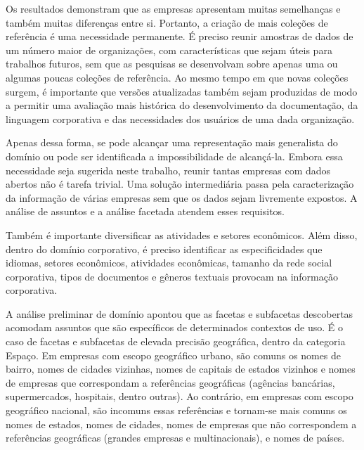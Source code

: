 
Os resultados demonstram que as empresas apresentam muitas semelhanças e também muitas diferenças entre si. Portanto, a criação de mais coleções de referência é uma necessidade permanente. É preciso reunir amostras de dados de um número maior de organizações, com características que sejam úteis para trabalhos futuros, sem que as pesquisas se desenvolvam sobre apenas uma ou algumas poucas coleções de referência. Ao mesmo tempo em que novas coleções surgem, é importante que versões atualizadas também sejam produzidas de modo a permitir uma avaliação mais histórica do desenvolvimento da documentação, da linguagem corporativa e das necessidades dos usuários de uma dada organização. 

Apenas dessa forma, se pode alcançar uma representação mais generalista do domínio ou pode ser identificada a impossibilidade de alcançá-la. Embora essa necessidade seja sugerida neste trabalho, reunir tantas empresas com dados abertos não é tarefa trivial. Uma solução intermediária passa pela caracterização da informação de várias empresas sem que os dados sejam livremente expostos. A análise de assuntos e a análise facetada atendem esses requisitos.


Também é importante diversificar as atividades e setores econômicos. Além disso, dentro do domínio corporativo, é preciso identificar as especificidades que idiomas, setores econômicos, atividades econômicas, tamanho da rede social corporativa, tipos de documentos e gêneros textuais provocam na informação corporativa.

A análise preliminar de domínio apontou que as facetas e subfacetas descobertas acomodam assuntos que são específicos de determinados contextos de uso. É o caso de facetas e subfacetas de elevada precisão geográfica, dentro da categoria Espaço. Em empresas com escopo geográfico urbano, são comuns os nomes de bairro, nomes de cidades vizinhas, nomes de capitais de estados vizinhos e nomes de empresas que correspondam a referências geográficas (agências bancárias, supermercados, hospitais, dentro outras). Ao contrário, em empresas com escopo geográfico nacional, são incomuns essas referências e tornam-se mais comuns os nomes de estados, nomes de cidades, nomes de empresas que não correspondem a referências geográficas (grandes empresas e multinacionais), e nomes de países.



